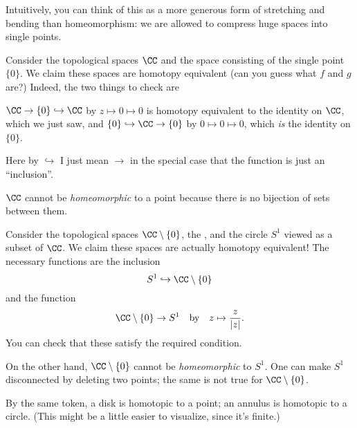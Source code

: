 Intuitively, you can think of this as a more generous form of stretching
and bending than homeomorphism: we are allowed to compress huge spaces into single points.

\begin{example}[$\CC$ is contractible]
	Consider the topological spaces $\CC$
	and the space consisting of the single point $\{0\}$.
	We claim these spaces are homotopy equivalent (can you guess what $f$ and $g$ are?)
	Indeed, the two things to check are
	\begin{enumerate}[(i)]
		\ii $\CC \to \{0\} \hookrightarrow \CC$ by $z \mapsto 0 \mapsto 0$
		is homotopy equivalent to the identity on $\CC$, which we just saw, and
		\ii $\{0\} \hookrightarrow \CC \to \{0\}$ by $0 \mapsto 0 \mapsto 0$, which \emph{is} the identity on $\{0\}$.
	\end{enumerate}
	Here by $\hookrightarrow$ I just mean $\to$ in the special case
	that the function is just an ``inclusion''.
\end{example}
\begin{remark}
	$\CC$ cannot be \emph{homeomorphic} to a point
	because there is no bijection of sets between them.
\end{remark}

\begin{example}
	Consider the topological spaces $\CC \setminus \{0\}$,
	the , and the circle $S^1$ viewed as a subset of $\CC$.
	We claim these spaces are actually homotopy equivalent!
	The necessary functions are the inclusion
	\[ S^1 \hookrightarrow \CC \setminus \{0\} \]
	and the function
	\[ \CC \setminus \{0\} \to S^1
		\quad\text{by}\quad
		z \mapsto \frac{z}{\left\lvert z \right\rvert}. \]
	You can check that these satisfy the required condition.
\end{example}
\begin{remark}
	On the other hand, $\CC \setminus \{0\}$ cannot be \emph{homeomorphic} to $S^1$.
	One can make $S^1$ disconnected by deleting two points;
	the same is not true for $\CC \setminus \{0\}$.
\end{remark}
\begin{example}
	[$\text{Disk} = \text{Point}$, $\text{Annulus} = \text{Circle}$]
	By the same token, a disk is homotopic to a point;
	an annulus is homotopic to a circle.
	(This might be a little easier to visualize, since it's finite.)
\end{example}

